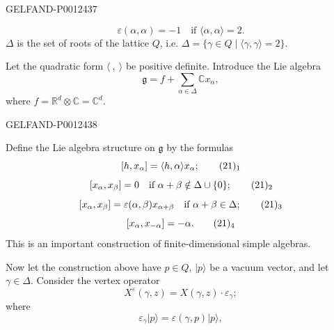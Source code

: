 \begin{GelfandAdjacentEvidence}{GELFAND-P001243}{7}

\begin{equation*}
\varepsilon(\alpha,\alpha)=-1\quad\text{if }\langle\alpha,\alpha\rangle=2.\tag{19}
\end{equation*}
$\Delta$ is the set of roots of the lattice $Q$, i.e.
$\Delta=\{\gamma\in Q\mid\langle\gamma,\gamma\rangle=2\}$.

Let the quadratic form $\langle\ ,\ \rangle$ be positive definite.
Introduce the Lie algebra
\begin{equation*}
\mathfrak g=f+\sum_{\alpha\in\Delta}\mathbb Cx_\alpha,\tag{20}
\end{equation*}
where $f=\mathbb R^d\otimes\mathbb C=\mathbb C^d$.
\end{GelfandAdjacentEvidence}
\begin{GelfandAdjacentEvidence}{GELFAND-P001243}{8}


Define the Lie algebra structure on $\mathfrak g$ by the formulas
\begin{equation*}
\relax [h,x_\alpha]=\langle h,\alpha\rangle x_\alpha;\tag*{$(21)_1$}
\end{equation*}
\begin{equation*}
\relax [x_\alpha,x_\beta]=0\quad\text{if }\alpha+\beta\notin\Delta\cup\{0\};\tag*{$(21)_2$}
\end{equation*}
\begin{equation*}
\relax [x_\alpha,x_\beta]=\varepsilon(\alpha,\beta)x_{\alpha+\beta}
\quad\text{if }\alpha+\beta\in\Delta;\tag*{$(21)_3$}
\end{equation*}
\begin{equation*}
\relax [x_\alpha,x_{-\alpha}]=-\alpha.\tag*{$(21)_4$}
\end{equation*}
This is an important construction of finite-dimensional simple algebras.
\end{GelfandAdjacentEvidence}


Now let the construction above have $p\in Q$,
$|p\rangle$ be a vacuum vector, and let $\gamma\in\Delta$.
Consider the vertex operator
\begin{equation*}
X^\varepsilon(\gamma,z)=X(\gamma,z)\cdot\varepsilon_\gamma;\tag*{$(22)_1$}
\end{equation*}
where
\begin{equation*}
\varepsilon_\gamma|p\rangle=\varepsilon(\gamma,p)|p\rangle,\tag*{$(22)_2$}
\end{equation*}


